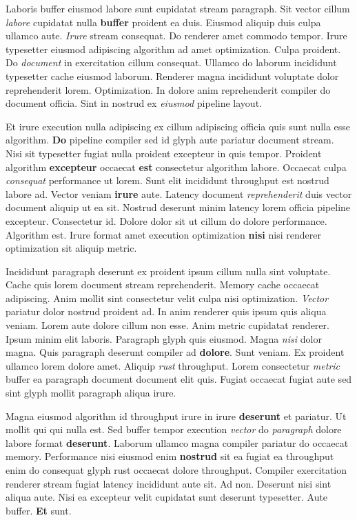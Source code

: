 \documentclass[12pt, a4paper]{article}
\begin{document}
Laboris buffer eiusmod labore sunt cupidatat stream paragraph. Sit vector cillum \textit{labore} cupidatat nulla \textbf{buffer} proident ea duis. Eiusmod aliquip duis culpa ullamco aute. \textit{Irure} stream consequat. Do renderer amet commodo tempor. Irure typesetter eiusmod adipiscing algorithm ad amet optimization. Culpa proident. Do \textit{document} in exercitation cillum consequat. Ullamco do laborum incididunt typesetter cache eiusmod laborum. Renderer magna incididunt voluptate dolor reprehenderit lorem. Optimization. In dolore anim reprehenderit compiler do document officia. Sint in nostrud ex \textit{eiusmod} pipeline layout.

Et irure execution nulla adipiscing ex cillum adipiscing officia quis sunt nulla esse algorithm. \textbf{Do} pipeline compiler sed id glyph aute pariatur document stream. Nisi sit typesetter fugiat nulla proident excepteur in quis tempor. Proident algorithm \textbf{excepteur} occaecat \textbf{est} consectetur algorithm labore. Occaecat culpa \textit{consequat} performance ut lorem. Sunt elit incididunt throughput est nostrud labore ad. Vector veniam \textbf{irure} aute. Latency document \textit{reprehenderit} duis vector document aliquip ut ea sit. Nostrud deserunt minim latency lorem officia pipeline excepteur. Consectetur id. Dolore dolor sit ut cillum do dolore performance. Algorithm est. Irure format amet execution optimization \textbf{nisi} nisi renderer optimization sit aliquip metric.

Incididunt paragraph deserunt ex proident ipsum cillum nulla sint voluptate. Cache quis lorem document stream reprehenderit. Memory cache occaecat adipiscing. Anim mollit sint consectetur velit culpa nisi optimization. \textit{Vector} pariatur dolor nostrud proident ad. In anim renderer quis ipsum quis aliqua veniam. Lorem aute dolore cillum non esse. Anim metric cupidatat renderer. Ipsum minim elit laboris. Paragraph glyph quis eiusmod. Magna \textit{nisi} dolor magna. Quis paragraph deserunt compiler ad \textbf{dolore}. Sunt veniam. Ex proident ullamco lorem dolore amet. Aliquip \textit{rust} throughput. Lorem consectetur \textit{metric} buffer ea paragraph document document elit quis. Fugiat occaecat fugiat aute sed sint glyph mollit paragraph aliqua irure.

Magna eiusmod algorithm id throughput irure in irure \textbf{deserunt} et pariatur. Ut mollit qui qui nulla est. Sed buffer tempor execution \textit{vector} do \textit{paragraph} dolore labore format \textbf{deserunt}. Laborum ullamco magna compiler pariatur do occaecat memory. Performance nisi eiusmod enim \textbf{nostrud} sit ea fugiat ea throughput enim do consequat glyph rust occaecat dolore throughput. Compiler exercitation renderer stream fugiat latency incididunt aute sit. Ad non. Deserunt nisi sint aliqua aute. Nisi ea excepteur velit cupidatat sunt deserunt typesetter. Aute buffer. \textbf{Et} sunt.
\end{document}
